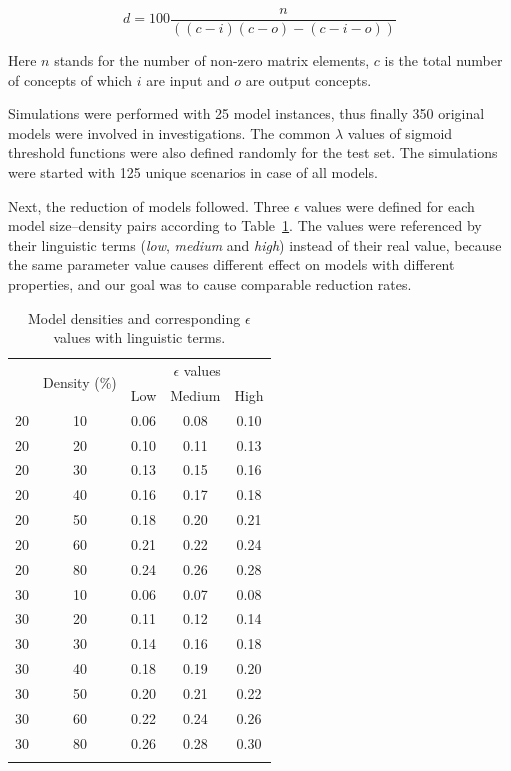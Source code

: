 \documentclass[graybox]{svmult}
\begin{document}
\begin{equation}
  \label{eq:density}
  d = 100 \frac{n}{\left( (c-i)(c-o) - (c-i-o) \right)}
\end{equation}

Here $n$ stands for the number of non-zero matrix elements, $c$ is the 
total number of concepts of which $i$ are input and $o$ are output concepts.

Simulations were performed with 25 model instances, thus finally 350 
original models were involved in investigations. The common $\lambda$ 
values of sigmoid threshold functions were also defined randomly for 
the test set. The simulations were started with 125 unique scenarios in 
case of all models.

Next, the reduction of models followed. Three $\epsilon$ values were 
defined for each model size--density pairs according to 
Table~\ref{tbl:epsilonDensities}. The values were referenced by their 
linguistic terms (\emph{low}, \emph{medium} and \emph{high}) instead of 
their real value, because the same parameter value causes different 
effect on models with different properties, and our goal was to cause 
comparable reduction rates.

\begin{table}[!t]
  \caption{Model densities and corresponding $\epsilon$ values with linguistic terms.}
  \label{tbl:epsilonDensities}
  \centering
  \begin{tabular}{ccccc}
    \hline\noalign{\smallskip}
    \multirow{2}{*}{No. of concepts} & \multirow{2}{*}{Density (\%)} & \multicolumn{3}{c}{$\epsilon$ values} \\
    \cline{3-5}
    & & Low & Medium & High \\
    \noalign{\smallskip}\svhline\noalign{\smallskip}
    20 & 10 & 0.06 & 0.08 & 0.10 \\
    20 & 20 & 0.10 & 0.11 & 0.13 \\
    20 & 30 & 0.13 & 0.15 & 0.16 \\
    20 & 40 & 0.16 & 0.17 & 0.18 \\
    20 & 50 & 0.18 & 0.20 & 0.21 \\
    20 & 60 & 0.21 & 0.22 & 0.24 \\
    20 & 80 & 0.24 & 0.26 & 0.28 \\
    30 & 10 & 0.06 & 0.07 & 0.08 \\
    30 & 20 & 0.11 & 0.12 & 0.14 \\
    30 & 30 & 0.14 & 0.16 & 0.18 \\
    30 & 40 & 0.18 & 0.19 & 0.20 \\
    30 & 50 & 0.20 & 0.21 & 0.22 \\
    30 & 60 & 0.22 & 0.24 & 0.26 \\
    30 & 80 & 0.26 & 0.28 & 0.30 \\
    \noalign{\smallskip}\hline\noalign{\smallskip}
  \end{tabular}
\end{table}
\end{document}
